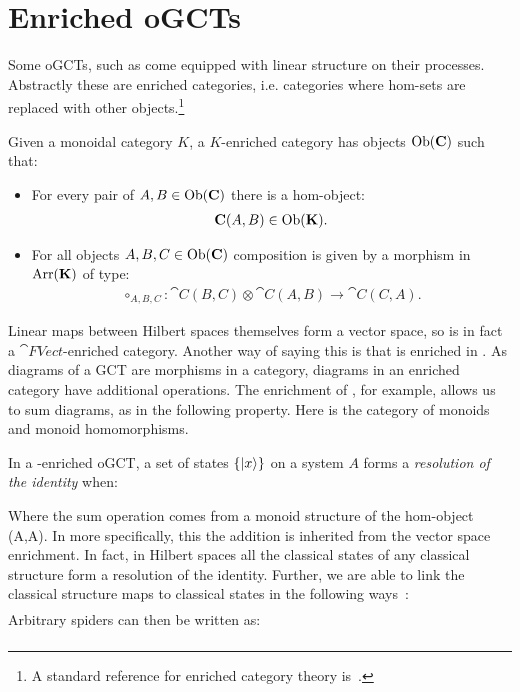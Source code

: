 \section{Enriched oGCTs}
\label{sec:enrichedogcts}
Some oGCTs, such as  come equipped with linear structure on their processes. Abstractly these are enriched categories, i.e. categories where hom-sets are replaced with other objects.\footnote{A standard reference for enriched category theory is~\cite{kelly1982basic}.}

\begin{defn}
\label{def:enrichedcat}
Given a monoidal category $K$, a $K$-enriched category  has objects $\mbox{Ob}(\mathbf{C})$ such that:
\begin{itemize}
\item For every pair of $A,B\in\mbox{Ob}(\mathbf{C})$ there is a hom-object:
\begin{align}
\mathbf{C}(A,B)\in \mbox{Ob}(\mathbf{K}).
\end{align}
\item For all objects $A,B,C\in\mbox{Ob}(\mathbf{C})$ composition is given by a morphism in $\mbox{Arr}(\mathbf{K})$ of type:
\begin{align}
 \circ_{A,B,C}:\cat{C}(B,C)\otimes\cat{C}(A,B)\to\cat{C}(C,A).
\end{align}
\end{itemize}
\end{defn}

Linear maps between Hilbert spaces themselves form a vector space, so  is in fact a $\cat{FVect}$-enriched category. Another way of saying this is that  is enriched in . As diagrams of a GCT are morphisms in a category, diagrams in an enriched category have additional operations. The  enrichment of , for example, allows us to sum diagrams, as in the following property. Here  is the category of monoids and monoid homomorphisms.


\begin{defn}
\label{def:resid}
In a -enriched oGCT, a set of states $\{| x \rangle\}$ on a system $A$ forms a \emph{resolution of the identity} when:
\begin{equation}
\label{eq:ResolutionId}

\end{equation}
\end{defn}

\noindent Where the sum operation comes from a monoid structure of the hom-object (A,A). In  more specifically, this the addition is inherited  from the vector space enrichment. In fact, in Hilbert spaces all the classical states of any classical structure form a resolution of the identity. Further, we are able to link the classical structure maps to classical states in the following ways~\cite{coecke2015generalised}:
\begin{align}
\label{eq:spidersums}

\end{align}
Arbitrary spiders can then be written as:
\begin{align}

\end{align}

